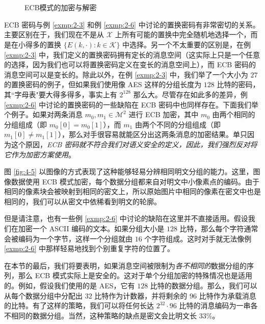 \begin{figure}
  \centering
  \subfigure[加密]{}
  
  \,
  
  \,
  
  \subfigure[解密]{}
  \caption{ECB模式的加密与解密}
  \label{fig:4-4}
\end{figure}

ECB 密码与例 \ref{exmp:2-3} 和例 \ref{exmp:2-6} 中讨论的置换密码有非常密切的关系。主要区别在于，我们现在不是从 $\mathcal{X}$ 上所有可能的置换中完全随机地选择一个，而是在小得多的置换 $\{E(k,\cdot):k\in\mathcal{K}\}$ 中选择。另一个不太重要的区别是，在例 \ref{exmp:2-3} 中，我们定义的置换密码拥有定长的消息空间（这实际上只是一个任意的选择，因为我们也可以将置换密码定义在变长的消息空间上），而 ECB 密码的消息空间可以是变长的。除此以外，在例 \ref{exmp:2-3} 中，我们举了一个大小为 $27$ 的置换密码的例子，但如果我们使用像 AES 这样的分组长度为 $128$ 比特的密码，其``字母表"要大得多得多，事实上有 $2^{128}$ 那么大。尽管存在如此多的差异，例 \ref{exmp:2-6} 中讨论的置换密码的一些缺陷在 ECB 密码中也同样存在。下面我们举个例子。如果对两条消息 $m_0,m_1\in\mathcal{M}^2$ 进行 ECB 加密，其中 $m_0$ 由两个相同的分组组成（即 $m_0[0]=m_0[1]$），而 $m_1$ 由两个不同的分组组成（即 $m_1[0]\neq m_1[1]$），那么对手很容易就能区分出这两条消息的加密结果。单只因为这个原因，\emph{ECB 密码就不符合我们对语义安全的定义，因此，我们强烈反对将它作为加密方案使用}。

图 \ref{fig:4-5} 以图像的方式表现了这种能够轻易分辨相同明文分组的能力。这里，图像数据使用 ECB 模式加密，每个数据分组都来自对明文中小像素点的编码。由于相同的像素块会被映射到相同的密文上，所以原始图片中相同的像素在密文中也是相同的，我们可以从密文中依稀看到明文的轮廓。

但是请注意，也有一些例 \ref{exmp:2-6} 中讨论的缺陷在这里并不直接适用。假设我们在加密一个 ASCII 编码的文本。如果分组大小是 $128$ 比特，那么每个字符通常会被编码为一个字节，这样一个分组就由 $16$ 个字符组成。这时对手就无法像例 \ref{exmp:2-6} 中那样轻易地找到个别重复字符的位置了。

\vspace{10pt}

在本节的最后，我们将要表明，如果消息空间被限制为\emph{各不相同的}数据分组的序列，那么 ECB 模式实际上是安全的。这对于单个分组加密的特殊情况也是适用的。例如，假设我们使用的是 AES，它有 $128$ 比特的数据分组。那么，我们可以从每个数据分组中分配出 $32$ 比特作为计数器，并将剩余的 $96$ 比特作为承载消息的比特。有了这样的策略，我们可以将任何长达 $2^{32}\cdot 96$ 比特的消息编码为一串各不相同的数据分组。当然，这种策略的缺点是密文会比明文长 $33\%$。


